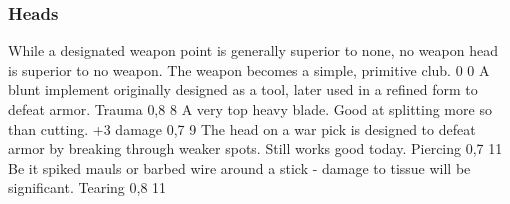 \pagebreak
\subsubsection{Heads}
\vspace{8mm}
\begin{multicols}{2}
    {While a designated weapon point is generally superior to none,
        no weapon head is superior to no weapon.}
    {The weapon becomes a simple, primitive club.}
    {0}
    {0}
    {}
    {A blunt implement originally designed as a tool,
        later used in a refined form to defeat armor.}
    {Trauma}
    {0,8}
    {8}
    {}
    {A very top heavy blade.
        Good at splitting more so than cutting.}
    {+3 damage}
    {0,7}
    {9}
    {}
    {The head on a war pick is designed to defeat armor by breaking through weaker spots.
        Still works good today.}
    {Piercing}
    {0,7}
    {11}
    {}
    {Be it spiked mauls or barbed wire around a stick
        - damage to tissue will be significant.}
    {Tearing}
    {0,8}
    {11}
    {}
\end{multicols}

